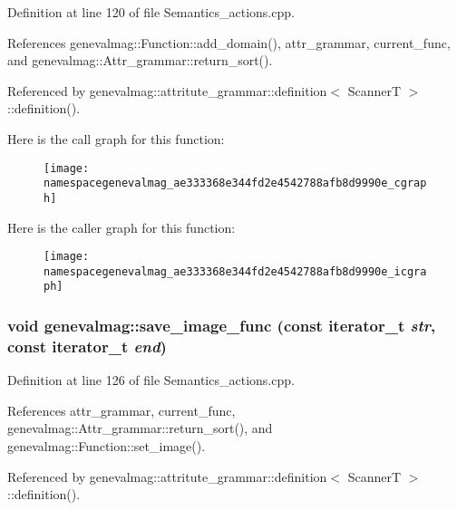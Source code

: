Definition at line 120 of file Semantics\_\-actions.cpp.



References genevalmag::Function::add\_\-domain(), attr\_\-grammar, current\_\-func, and genevalmag::Attr\_\-grammar::return\_\-sort().



Referenced by genevalmag::attritute\_\-grammar::definition$<$ ScannerT $>$::definition().



Here is the call graph for this function:\nopagebreak
\begin{figure}[H]
\begin{center}
\leavevmode
\texttt{[image: namespacegenevalmag\_ae333368e344fd2e4542788afb8d9990e\_cgraph]}
\end{center}
\end{figure}




Here is the caller graph for this function:\nopagebreak
\begin{figure}[H]
\begin{center}
\leavevmode
\texttt{[image: namespacegenevalmag\_ae333368e344fd2e4542788afb8d9990e\_icgraph]}
\end{center}
\end{figure}


\hypertarget{namespacegenevalmag_a6c5fe5628b5ac4b3e2d9c4fc93985abe}{
\subsubsection[{save\_\-image\_\-func}]{\setlength{\rightskip}{0pt plus 5cm}void genevalmag::save\_\-image\_\-func (const iterator\_\-t {\em str}, \/  const iterator\_\-t {\em end})}}
\label{namespacegenevalmag_a6c5fe5628b5ac4b3e2d9c4fc93985abe}


Definition at line 126 of file Semantics\_\-actions.cpp.



References attr\_\-grammar, current\_\-func, genevalmag::Attr\_\-grammar::return\_\-sort(), and genevalmag::Function::set\_\-image().



Referenced by genevalmag::attritute\_\-grammar::definition$<$ ScannerT $>$::definition().



